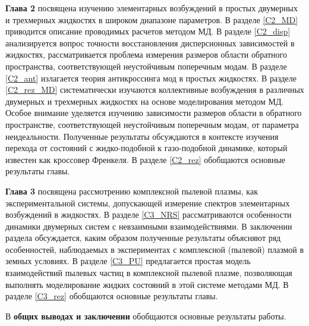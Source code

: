 \textbf{Глава 2} посвящена изучению элементарных возбуждений в простых двумерных и трехмерных жидкостях в широком диапазоне параметров.
В разделе \ref{C2_MD} приводится описание проводимых расчетов методом МД.
В разделе \ref{C2_disp} анализируется вопрос точности восстановления дисперсионных зависимостей в жидкостях, рассматривается проблема измерения размеров области обратного пространства, соответствующей неустойчивым поперечным модам.
В разделе \ref{C2_ant} излагается теория антикроссинга мод в простых жидкостях.
В разделе \ref{C2_rez_MD} систематически изучаются коллективные возбуждения в различных двумерных и трехмерных жидкостях на основе моделирования методом МД.
Особое внимание уделяется изучению зависимости размеров области в обратного пространстве, соответствующей неустойчивым поперечным модам, от параметра неидеальности.
Полученные результаты обсуждаются в контексте изучения перехода от состояний с жидко-подобной к газо-подобной динамике, который известен как кроссовер Френкеля.
В разделе \ref{C2_rez} обобщаются основные результаты главы.

\textbf{Глава 3} посвящена рассмотрению комплексной пылевой плазмы, как экспериментальной системы, допускающей измерение спектров элементарных возбуждений в жидкостях.
В разделе \ref{C3_NRS} рассматриваются особенности динамики двумерных систем с невзаимными взаимодействиями.
В заключении раздела обсуждается, каким образом полученные результаты объясняют ряд особенностей, наблюдаемых в экспериментах с комплексной (пылевой) плазмой в земных условиях.
В разделе \ref{C3_PU} предлагается простая модель взаимодействий пылевых частиц в комплексной пылевой плазме, позволяющая выполнять моделирование жидких состояний в этой системе методами МД.
В разделе \ref{C3_rez} обобщаются основные результаты главы.

В \textbf{общих выводах и заключении} обобщаются основные результаты работы.
